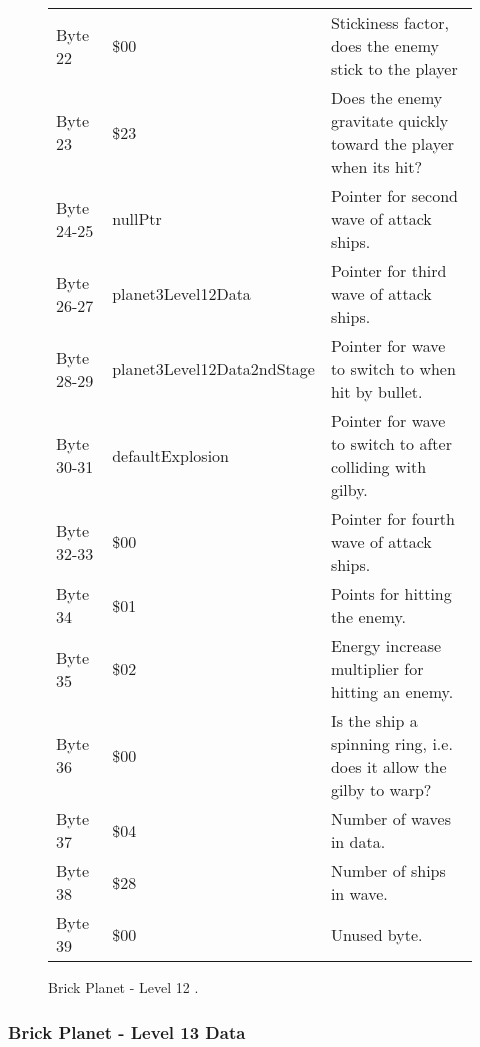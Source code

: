 \begin{figure}[H]
{\begin{adjustbox}{width=12cm}
\begin{tabular}{lll}
 Byte 22    & \$00                        & Stickiness factor, does the enemy stick to the player               \\
 Byte 23    & \$23                        & Does the enemy gravitate quickly toward the player when its hit?    \\
 Byte 24-25 & nullPtr                    & Pointer for second wave of attack ships.                            \\
 Byte 26-27 & planet3Level12Data         & Pointer for third wave of attack ships.                             \\
 Byte 28-29 & planet3Level12Data2ndStage & Pointer for wave to switch to when hit by bullet.                   \\
 Byte 30-31 & defaultExplosion           & Pointer for  wave to switch to after colliding with gilby.          \\
 Byte 32-33 & \$00                        & Pointer for fourth wave of attack ships.                            \\
 Byte 34    & \$01                        & Points for hitting the enemy.                                       \\
 Byte 35    & \$02                        & Energy increase multiplier for hitting an enemy.                    \\
 Byte 36    & \$00                        & Is the ship a spinning ring, i.e. does it allow the gilby to warp?  \\
 Byte 37    & \$04                        & Number of waves in data.                                            \\
 Byte 38    & \$28                        & Number of ships in wave.                                            \\
 Byte 39    & \$00                        & Unused byte.                                                        \\
\bottomrule
\end{tabular}

  \end{adjustbox}

  }\caption*{Brick Planet - Level 12
.}
\end{figure}

\clearpage
\subsubsection{Brick Planet - Level 13 Data}

